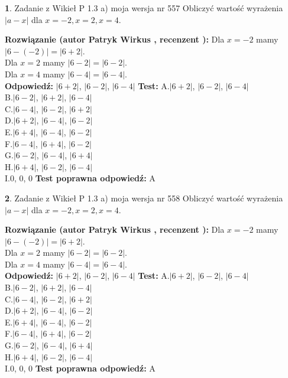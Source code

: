 \documentclass[12pt, a4paper]{article}
\theoremstyle{definition} %
\newtheorem{zad}{}
\newcommand{\zadStart}[1]{\begin{zad}#1\newline}
\newcommand{\zadStop}{\end{zad}}
\newcommand{\rozwStart}[2]{\noindent \textbf{Rozwiązanie (autor #1 , recenzent #2): }\newline}
\newcommand{\rozwStop}{\newline}
\newcommand{\odpStart}{\noindent \textbf{Odpowiedź:}\newline}
\newcommand{\odpStop}{\newline}
\newcommand{\testStart}{\noindent \textbf{Test:}\newline}
\newcommand{\testStop}{\newline}
\newcommand{\kluczStart}{\noindent \textbf{Test poprawna odpowiedź:}\newline}
\newcommand{\kluczStop}{\newline}
\begin{document}
\zadStart{Zadanie z Wikieł P 1.3 a) moja wersja nr 557}
Obliczyć wartość wyrażenia $|a - x|$ dla $x=-2,x=2,x=4$.
\zadStop
\rozwStart{Patryk Wirkus}{}
Dla $x = -2$ mamy $|6 - (-2)| = |6 + 2|$.\\
Dla $x = 2$ mamy $|6 - 2| = |6 - 2|$.\\
Dla $x = 4$ mamy $|6 - 4| = |6 - 4|$.\\
\rozwStop
\odpStart
$|6 + 2|$, $|6 - 2|$, $|6 - 4|$
\odpStop
\testStart
A.$|6 + 2|$, $|6 - 2|$, $|6 - 4|$\\
B.$|6 - 2|$, $|6 + 2|$, $|6 - 4|$\\
C.$|6 - 4|$, $|6 - 2|$, $|6 + 2|$\\
D.$|6 + 2|$, $|6 - 4|$, $|6 - 2|$\\
E.$|6 + 4|$, $|6 - 4|$, $|6 - 2|$\\
F.$|6 - 4|$, $|6 + 4|$, $|6 - 2|$\\
G.$|6 - 2|$, $|6 - 4|$, $|6 + 4|$\\
H.$|6 + 4|$, $|6 - 2|$, $|6 - 4|$\\
I.$0$, $0$, $0$
\testStop
\kluczStart
A
\kluczStop



\zadStart{Zadanie z Wikieł P 1.3 a) moja wersja nr 558}
Obliczyć wartość wyrażenia $|a - x|$ dla $x=-2,x=2,x=4$.
\zadStop
\rozwStart{Patryk Wirkus}{}
Dla $x = -2$ mamy $|6 - (-2)| = |6 + 2|$.\\
Dla $x = 2$ mamy $|6 - 2| = |6 - 2|$.\\
Dla $x = 4$ mamy $|6 - 4| = |6 - 4|$.\\
\rozwStop
\odpStart
$|6 + 2|$, $|6 - 2|$, $|6 - 4|$
\odpStop
\testStart
A.$|6 + 2|$, $|6 - 2|$, $|6 - 4|$\\
B.$|6 - 2|$, $|6 + 2|$, $|6 - 4|$\\
C.$|6 - 4|$, $|6 - 2|$, $|6 + 2|$\\
D.$|6 + 2|$, $|6 - 4|$, $|6 - 2|$\\
E.$|6 + 4|$, $|6 - 4|$, $|6 - 2|$\\
F.$|6 - 4|$, $|6 + 4|$, $|6 - 2|$\\
G.$|6 - 2|$, $|6 - 4|$, $|6 + 4|$\\
H.$|6 + 4|$, $|6 - 2|$, $|6 - 4|$\\
I.$0$, $0$, $0$
\testStop
\kluczStart
A
\kluczStop
\end{document}
